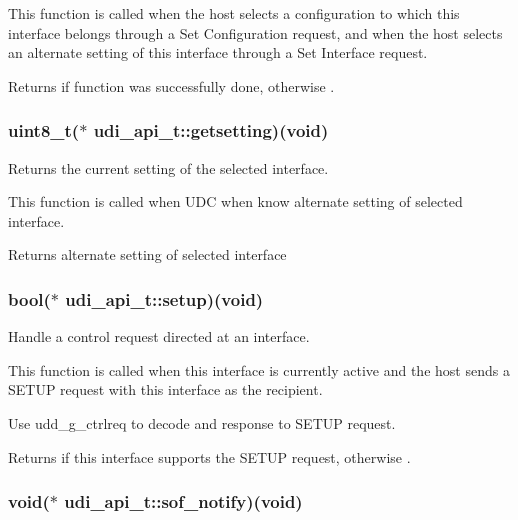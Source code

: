 \-This function is called when the host selects a configuration to which this interface belongs through a \-Set \-Configuration request, and when the host selects an alternate setting of this interface through a \-Set \-Interface request.

\begin{DoxyReturn}{\-Returns}
{} if function was successfully done, otherwise {}. 
\end{DoxyReturn}
\hypertarget{structudi__api__t_ad2b798a7cb160d55ed92162ecb845f97}{
\subsubsection[{getsetting}]{\setlength{\rightskip}{0pt plus 5cm}uint8\-\_\-t($\ast$ {\bf udi\-\_\-api\-\_\-t\-::getsetting})(void)}}
\label{structudi__api__t_ad2b798a7cb160d55ed92162ecb845f97}


\-Returns the current setting of the selected interface. 

\-This function is called when \-U\-D\-C when know alternate setting of selected interface.

\begin{DoxyReturn}{\-Returns}
alternate setting of selected interface 
\end{DoxyReturn}
\hypertarget{structudi__api__t_a8161cf3c75c90f630f7d1ee931be821d}{
\subsubsection[{setup}]{\setlength{\rightskip}{0pt plus 5cm}bool($\ast$ {\bf udi\-\_\-api\-\_\-t\-::setup})(void)}}
\label{structudi__api__t_a8161cf3c75c90f630f7d1ee931be821d}


\-Handle a control request directed at an interface. 

\-This function is called when this interface is currently active and the host sends a \-S\-E\-T\-U\-P request with this interface as the recipient.

\-Use udd\-\_\-g\-\_\-ctrlreq to decode and response to \-S\-E\-T\-U\-P request.

\begin{DoxyReturn}{\-Returns}
{} if this interface supports the \-S\-E\-T\-U\-P request, otherwise {}. 
\end{DoxyReturn}
\hypertarget{structudi__api__t_ab1dc2a8393441c196b1f5a93e9535f8e}{
\subsubsection[{sof\-\_\-notify}]{\setlength{\rightskip}{0pt plus 5cm}void($\ast$ {\bf udi\-\_\-api\-\_\-t\-::sof\-\_\-notify})(void)}}
\label{structudi__api__t_ab1dc2a8393441c196b1f5a93e9535f8e}


